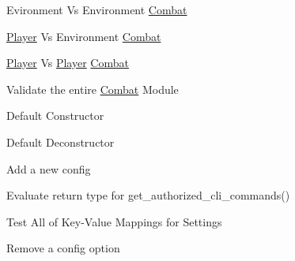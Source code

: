 \begin{DoxyRefList}
%
Evironment Vs Environment \mbox{\hyperlink{classCombat}{Combat}}  
\item[Member \mbox{\hyperlink{classTestCombat_a35d174e2341becc26a1f54b8c79197db}{Test\+Combat\+::PVECombat}} ()]\label{todo__todo000214}%
%
\mbox{\hyperlink{classPlayer}{Player}} Vs Environment \mbox{\hyperlink{classCombat}{Combat}}  
\item[Member \mbox{\hyperlink{classTestCombat_ab9c28a804fb6a294d276bf06c814a0de}{Test\+Combat\+::PVPCombat}} ()]\label{todo__todo000215}%
%
\mbox{\hyperlink{classPlayer}{Player}} Vs \mbox{\hyperlink{classPlayer}{Player}} \mbox{\hyperlink{classCombat}{Combat}}  
\item[Member \mbox{\hyperlink{classTestCombat_a5374dd1ec208d70d1c6b357d114a77f4}{Test\+Combat\+::test\+\_\+all}} ()]\label{todo__todo000212}%
%
Validate the entire \mbox{\hyperlink{classCombat}{Combat}} Module  
\item[Member \mbox{\hyperlink{classTestCombat_aa6a2cb666d674c1cc19644a77b06fc18}{Test\+Combat\+::Test\+Combat}} ()]\label{todo__todo000211}%
%
Default Constructor  
\item[Member \mbox{\hyperlink{classTestCombat_a3f857bd167d74e10cffce0d89630b78d}{Test\+Combat\+::$\sim$\+Test\+Combat}} ()]\label{todo__todo000216}%
%
Default Deconstructor  
\item[Member \mbox{\hyperlink{classTestConfig_a2179479694e8571ddf8664ab29af575d}{Test\+Config\+::add\+Config}} ()]\label{todo__todo000220}%
%
Add a new config  
\item[Member \mbox{\hyperlink{classTestConfig_ae419bbde8924939dc79066024203cb15}{Test\+Config\+::list\+Of\+Commands}} ()]\label{todo__todo000222}%
%
Evaluate return type for get\+\_\+authorized\+\_\+cli\+\_\+commands()  
\item[Member \mbox{\hyperlink{classTestConfig_a44301e3edfcdb49b09fa927d3b0784fb}{Test\+Config\+::mapping}} ()]\label{todo__todo000219}%
%
Test All of Key-\/\+Value Mappings for Settings  
\item[Member \mbox{\hyperlink{classTestConfig_ad5adbab363071f2c467cb38bf3d52b66}{Test\+Config\+::rem\+Config}} ()]\label{todo__todo000221}%
%
Remove a config option  
\item[Member \mbox{\hyperlink{classTestConfig_a4ea41e502a84fbf138ad0088c9bc7ed3}{Test\+Config\+::test\+\_\+all}} ()]\label{todo__todo000218}%

\end{DoxyRefList}

